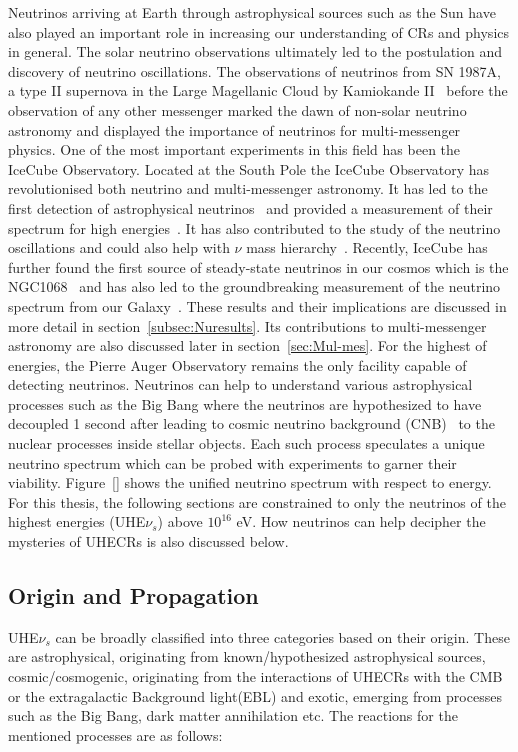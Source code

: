 Neutrinos arriving at Earth through astrophysical sources such as the Sun have also played an important role in increasing our understanding of CRs and physics in general. The solar neutrino observations ultimately led to the postulation and discovery of neutrino oscillations. The observations of neutrinos from SN 1987A, a type II supernova in the Large Magellanic Cloud by Kamiokande II~\cite{PhysRevLett.58.1490} before the observation of any other messenger marked the dawn of non-solar neutrino astronomy and displayed the importance of neutrinos for multi-messenger physics. One of the most important experiments in this field has been the IceCube Observatory. Located at the South Pole the IceCube Observatory has revolutionised both neutrino and multi-messenger astronomy. It has led to the first detection of astrophysical neutrinos~\cite{PhysRevLett.111.021103} and provided a measurement of their spectrum for high energies~\cite{doi:10.1126/science.1242856}. It has also contributed to the study of the neutrino oscillations\cite{Abbasi_2023_Oscillation} and could also help with $\nu$ mass hierarchy~\cite{psf2023008007}. Recently, IceCube has further found the first source of steady-state neutrinos in our cosmos which is the NGC1068~\cite{Icecube_2022} and has also led to the groundbreaking measurement of the neutrino spectrum from our Galaxy~\cite{Galactic_plane_nu_2023}. These results and their implications are discussed in more detail in section~\ref{subsec:Nuresults}. Its contributions to multi-messenger astronomy are also discussed later in section~\ref{sec:Mul-mes}. For the highest of energies, the Pierre Auger Observatory remains the only facility capable of detecting neutrinos. 
Neutrinos can help to understand various astrophysical processes such as the Big Bang where the neutrinos are hypothesized to have decoupled 1 second after leading to cosmic neutrino background (CNB)~\cite{scott2024cosmicneutrinobackground} to the nuclear processes inside stellar objects. Each such process speculates a unique neutrino spectrum which can be probed with experiments to garner their viability. Figure~\ref{} shows the unified neutrino spectrum with respect to energy. For this thesis, the following sections are constrained to only the neutrinos of the highest energies (UHE$\nu_s$) above $10^16$ eV. How neutrinos can help decipher the mysteries of UHECRs is also discussed below.


\subsection{Origin and Propagation}
\label{subsec:nuorig}
UHE$\nu_s$ can be broadly classified into three categories based on their origin. These are astrophysical, originating from known/hypothesized astrophysical sources, cosmic/cosmogenic, originating from the interactions of UHECRs with the CMB or the extragalactic Background light(EBL) and exotic, emerging from processes such as the Big Bang, dark matter annihilation etc. The reactions for the mentioned processes are as follows:


